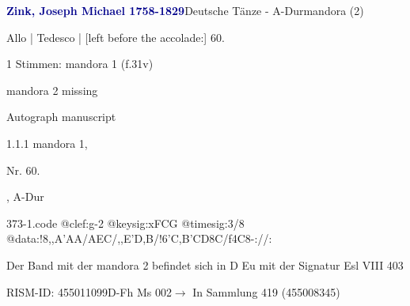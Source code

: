 \documentclass[twocolumn]{book}
\begin{document}
\par \vspace{7pt} \textcolor{darkblue}{\textbf{Zink, Joseph Michael  1758-1829}}\hfillplus{\textbf{[373]}}\newline Deutsche Tänze - A-Dur\newline mandora (2)
\par \begin{itshape}[f.31v, at left:] Allo | Tedesco | [left before the accolade:] 60.\end{itshape} 
\par \textcolor{darkblue}{}  1 Stimmen: mandora 1  (f.31v)\newline \begin{small} mandora 2 missing\end{small} \newline Autograph manuscript
\par 1.1.1  mandora 1, \begin{itshape}Nr. 60.\end{itshape}, A-Dur  
\begin{filecontents*}{373-1.code}
@clef:g-2
@keysig:xFCG
@timesig:3/8
@data:!8,,A'AA/AEC/,,E'D,B/!{6'C,B'CD8C}/f4C8-://:
\end{filecontents*}
\newline
%
\par Der Band mit der mandora 2 befindet sich in D Eu mit der Signatur Esl VIII 403
\par RISM-ID: 455011099\newline D-Fh  Ms 002\newline $\rightarrow$ In Sammlung 419 (455008345)
      
\end{document}
